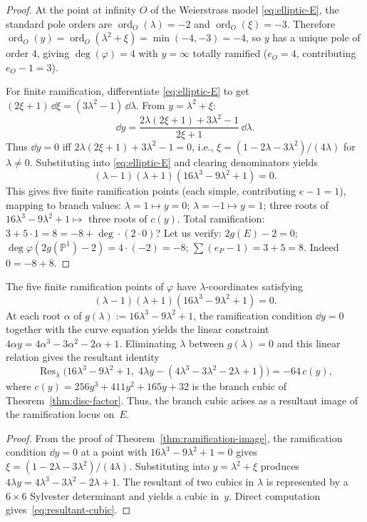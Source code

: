 \begin{proof}
At the point at infinity $O$ of the Weierstrass model \eqref{eq:elliptic-E}, the standard pole orders are $\operatorname{ord}_O(\lambda)=-2$ and $\operatorname{ord}_O(\xi)=-3$.
Therefore $\operatorname{ord}_O(y)=\operatorname{ord}_O(\lambda^2+\xi)=\min(-4,-3)=-4$,
so $y$ has a unique pole of order $4$, giving $\deg(\varphi)=4$ with $y=\infty$ totally ramified ($e_O=4$, contributing $e_O-1=3$).

For finite ramification, differentiate \eqref{eq:elliptic-E} to get $(2\xi+1)\,\dd\xi=(3\lambda^2-1)\,\dd\lambda$.
From $y=\lambda^2+\xi$:
\[
\dd y=\frac{2\lambda(2\xi+1)+3\lambda^2-1}{2\xi+1}\,\dd\lambda.
\]
Thus $\dd y=0$ iff $2\lambda(2\xi+1)+3\lambda^2-1=0$, i.e., $\xi=(1-2\lambda-3\lambda^2)/(4\lambda)$ for $\lambda\neq 0$.
Substituting into \eqref{eq:elliptic-E} and clearing denominators yields
\[
(\lambda-1)(\lambda+1)(16\lambda^3-9\lambda^2+1)=0.
\]
This gives five finite ramification points (each simple, contributing $e-1=1$), mapping to branch values:
$\lambda=1\mapsto y=0$; $\lambda=-1\mapsto y=1$; three roots of $16\lambda^3-9\lambda^2+1\mapsto$ three roots of $c(y)$.
Total ramification: $3+5\cdot 1=8=-8+\deg\cdot(2\cdot 0)$? Let us verify: $2g(E)-2=0$; $\deg\varphi(2g(\mathbb{P}^1)-2)=4\cdot(-2)=-8$; $\sum(e_P-1)=3+5=8$. Indeed $0=-8+8$. \checkmark
\end{proof}

\begin{corollary}\label{cor:resultant-branch-cubic}
The five finite ramification points of $\varphi$ have $\lambda$-coordinates satisfying
\[
(\lambda-1)(\lambda+1)(16\lambda^3-9\lambda^2+1)=0.
\]
At each root $\alpha$ of $g(\lambda):=16\lambda^3-9\lambda^2+1$, the ramification condition $\dd y=0$ together with the curve equation yields the linear constraint $4\alpha y=4\alpha^3-3\alpha^2-2\alpha+1$.
Eliminating $\lambda$ between $g(\lambda)=0$ and this linear relation gives the resultant identity
\begin{equation}\label{eq:resultant-cubic}
\operatorname{Res}_\lambda\!\bigl(16\lambda^3-9\lambda^2+1,\; 4\lambda y-(4\lambda^3-3\lambda^2-2\lambda+1)\bigr)=-64\,c(y),
\end{equation}
where $c(y)=256y^3+411y^2+165y+32$ is the branch cubic of Theorem~\ref{thm:disc-factor}.
Thus, the branch cubic arises as a resultant image of the ramification locus on~$E$.
\end{corollary}

\begin{proof}
From the proof of Theorem~\ref{thm:ramification-image}, the ramification condition $\dd y=0$ at a point with $16\lambda^3-9\lambda^2+1=0$ gives $\xi=(1-2\lambda-3\lambda^2)/(4\lambda)$.
Substituting into $y=\lambda^2+\xi$ produces $4\lambda y=4\lambda^3-3\lambda^2-2\lambda+1$.
The resultant of two cubics in $\lambda$ is represented by a $6\times 6$ Sylvester determinant and yields a cubic in~$y$.
Direct computation gives~\eqref{eq:resultant-cubic}.
\end{proof}


